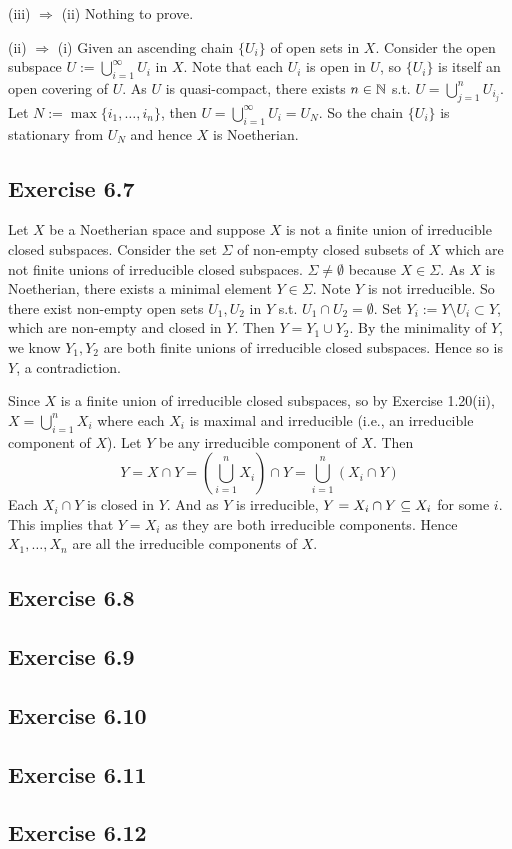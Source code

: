 \documentclass[../A&M.tex]{subfiles}
\begin{document}
(iii) $\Rightarrow$ (ii) Nothing to prove.

(ii) $\Rightarrow$ (i) Given an ascending chain $\{U_i\}$ of open sets in $X$. Consider the open subspace $U:=\bigcup_{i=1}^\infty U_i$ in $X$. Note that each $U_i$ is open in $U$, so $\{U_i\}$ is itself an open covering of $U$. As $U$ is quasi-compact, there exists $n\in\mathbb{N}$ s.t. $U = \bigcup_{j=1}^n U_{i_j}$. Let $N:=\max\{i_1,\ldots,i_n\}$, then $U = \bigcup_{i=1}^\infty U_i = U_N$. So the chain $\{U_i\}$ is stationary from $U_N$ and hence $X$ is Noetherian.

\subsection*{Exercise 6.7}

Let $X$ be a Noetherian space and suppose $X$ is not a finite union of irreducible closed subspaces. Consider the set $\Sigma$ of non-empty closed subsets of $X$ which are not finite unions of irreducible closed subspaces. $\Sigma \neq \emptyset$ because $X\in\Sigma$. As $X$ is Noetherian, there exists a minimal element $Y\in\Sigma$. Note $Y$ is not irreducible. So there exist non-empty open sets $U_1,U_2$ in $Y$ s.t. $U_1 \cap U_2 = \emptyset$. Set $Y_i := Y \setminus U_i \subset Y$, which are non-empty and closed in $Y$. Then $Y = Y_1 \cup Y_2$. By the minimality of $Y$, we know $Y_1,Y_2$ are both finite unions of irreducible closed subspaces. Hence so is $Y$, a contradiction.

Since $X$ is a finite union of irreducible closed subspaces, so by Exercise 1.20(ii), $X = \bigcup_{i=1}^n X_i$ where each $X_i$ is maximal and irreducible (i.e., an irreducible component of $X$). Let $Y$ be any irreducible component of $X$. Then
$$
Y = X \cap Y = \left( \bigcup_{i=1}^n X_i \right) \cap Y = \bigcup_{i=1}^n (X_i \cap Y)
$$
Each $X_i \cap Y$ is closed in $Y$. And as $Y$ is irreducible, $Y = X_i \cap Y \subseteq X_i$ for some $i$. This implies that $Y = X_i$ as they are both irreducible components. Hence $X_1,\ldots,X_n$ are all the irreducible components of $X$.

\subsection*{Exercise 6.8}

\subsection*{Exercise 6.9}

\subsection*{Exercise 6.10}

\subsection*{Exercise 6.11}

\subsection*{Exercise 6.12}
\phantom{}
\end{document}
